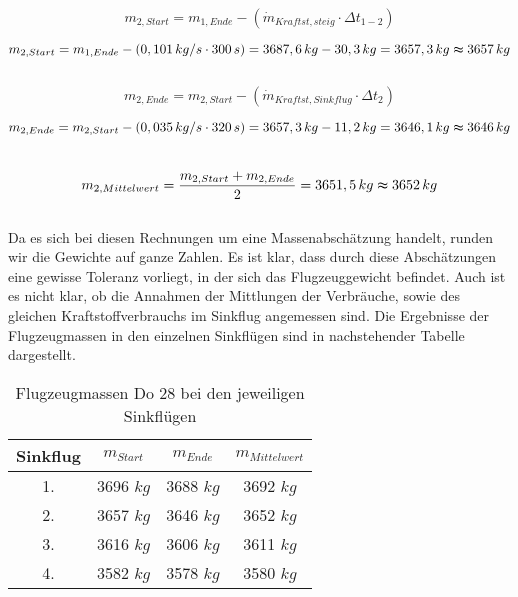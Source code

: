 \begin{equation*}
m_{2,Start} = m_{1,Ende} - (\dot{m}_{Kraftst,steig} \cdot \Delta t_{1-2})
\end{equation*}

\begin{equation*}
m_{2,Start} = m_{1,Ende} - (0,101 \, {kg/s} \cdot 300 \, {s}) = 3687,6 \, {kg} - 30,3 \, {kg} = 3657,3 \, {kg} \thickapprox 3657 \, {kg}
\end{equation*} \\

\begin{equation*}
m_{2,Ende} = m_{2,Start} - (\dot{m}_{Kraftst,Sinkflug} \cdot \Delta t_2)
\end{equation*}

\begin{equation*}
m_{2,Ende} = m_{2,Start} - (0,035 \, {kg/s} \cdot 320 \, {s}) = 3657,3 \, {kg} - 11,2 \, {kg} = 3646,1 \, {kg} \thickapprox 3646 \, {kg}
\end{equation*} \\

\begin{equation*}
m_{2,Mittelwert} = \frac{m_{2,Start} + m_{2,Ende}}{2} = 3651,5 \, {kg} \thickapprox 3652 \, {kg}
\end{equation*} \\

\noindent Da es sich bei diesen Rechnungen um eine Massenabschätzung handelt, runden wir die Gewichte auf ganze Zahlen. Es ist klar, dass durch diese Abschätzungen eine gewisse Toleranz vorliegt, in der sich das Flugzeuggewicht befindet. Auch ist es nicht klar, ob die Annahmen der Mittlungen der Verbräuche, sowie des gleichen Kraftstoffverbrauchs im Sinkflug angemessen sind. Die Ergebnisse der Flugzeugmassen in den einzelnen Sinkflügen sind in nachstehender Tabelle dargestellt.\\

\begin{table}[h]
	\centering
	\begin{tabular}{|c|c|c|c|}
		\hline
		\textbf{Sinkflug} & \textbf{$m_{Start}$} & \textbf{$m_{Ende}$} & \textbf{$m_{Mittelwert}$} \\ \hline
		1.	& 3696 $kg$	& 3688 $kg$ & 3692 $kg$    \\ \hline
		2.	& 3657 $kg$   & 3646 $kg$ & 3652 $kg$    \\ \hline
		3.	& 3616 $kg$	& 3606 $kg$ & 3611 $kg$	   \\ \hline
		4.  & 3582 $kg$	& 3578 $kg$ & 3580 $kg$    \\ \hline	
	\end{tabular}
	\caption{Flugzeugmassen Do 28 bei den jeweiligen Sinkflügen}
\end{table}


